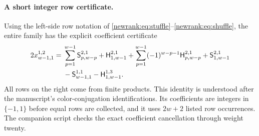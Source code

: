 \paragraph{A short integer row certificate.}
Using the left-side row notation of
\eqref{newrank:eq:stuffle}--\eqref{newrank:eq:shuffle}, the entire family
has the explicit coefficient certificate
\begin{align}
 2x_{w-1,1}^{1,2}
 ={}&\sum_{p=1}^{w-1}\mathsf S_{p,w-p}^{2,1}
   +\mathsf H_{1,w-1}^{2,1}
   +\sum_{p=1}^{w-1}(-1)^{w-p-1}\mathsf H_{p,w-p}^{2,1}
   +\mathsf S_{1,w-1}^{2,1}\notag\\
 &-\mathsf S_{w-1,1}^{1,1}-\mathsf H_{1,w-1}^{1,3}.
 \label{newmixed:eq:rowcertificate}
\end{align}
All rows on the right come from finite products.  This identity is
understood after the manuscript's color-conjugation identifications.
Its coefficients are integers in $\{-1,1\}$ before equal rows are
collected, and it uses $2w+2$ listed row occurrences.  The companion
script checks the exact coefficient cancellation through weight twenty.
